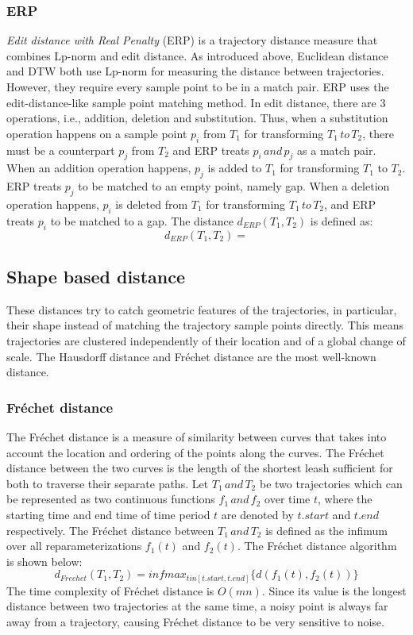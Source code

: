 \documentclass[a4paper, 12pt]{article}
\begin{document}
\subsubsection{ERP}
\textit{Edit distance with Real Penalty} (ERP) is a trajectory distance measure that combines Lp-norm and edit distance. As introduced above, Euclidean distance and DTW both use Lp-norm for measuring the distance between trajectories. However, they require every sample point to be in a match pair. ERP uses the edit-distance-like sample point matching method. In edit distance, there are 3 operations, i.e., addition, deletion and substitution. Thus, when a substitution operation happens on a sample point $p_{i}$ from $T_{1}$ for transforming $T_{1}\,to\,T_{2}$, there must be a counterpart $p_{j}$ from $T_{2}$ and ERP treats $p_{i}\,and\,p_{j}$ as a match pair. When an addition operation happens, $p_{j}$ is added to $T_{1}$ for transforming $T_{1}$ to $T_{2}$. ERP treats $p_{j}$ to be matched to an empty point, namely gap. When a deletion operation happens, $p_{i}$ is deleted from $T_{1}$ for transforming $T_{1}\,to\,T_{2}$, and ERP treats $p_{i}$ to be matched to a gap. The distance $d_{ERP}(T_{1},T_{2})$ is defined as:
\begin{equation} \label{eq5}
    d_{ERP}(T_{1},T_{2}) = 
\end{equation}

\subsection{Shape based distance}
These distances try to catch geometric features of the trajectories, in particular, their shape instead of matching the trajectory sample points directly. This means trajectories are clustered independently of their location and of a global change of scale. The Hausdorff distance and Fréchet distance are the most well-known distance.

\subsubsection{Fréchet distance}
The Fréchet distance is a measure of similarity between curves that takes into account the location and ordering of the points along the curves. The Fréchet distance between the two curves is the length of the shortest leash sufficient for both to traverse their separate paths. Let $T_{1}\,and\,T_{2}$ be two trajectories which can be represented as two continuous functions $f_{1}\,and\,f_{2}$ over time $t$, where the starting time and end time of time period $t$ are denoted by $t.start$ and $t.end$ respectively. The Fréchet distance between $T_{1}\,and\,T_{2}$ is defined as the infimum over all reparameterizations $f_{1}(t)$ and $f_{2}(t)$. The Fréchet distance algorithm is shown below:
\begin{equation} \label{eq6}
    d_{Frechet}(T_{1},T_{2}) = infmax_{t in [t.start, t.end]} \{d(f_{1}(t), f_{2}(t))\}
\end{equation}
The time complexity of Fréchet distance is $O(mn)$. Since its value is the longest distance between two trajectories at the same time, a noisy point is always far away from a trajectory, causing Fréchet distance to be very sensitive to noise.
\end{document}
